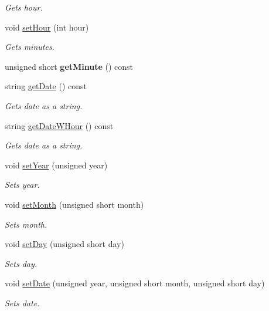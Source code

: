 \begin{DoxyCompactItemize}
\begin{DoxyCompactList}\small\item\em Gets hour. \end{DoxyCompactList}\item 
void \hyperlink{class_date_a39aed5716d41cecafc37be6a11556112}{set\+Hour} (int hour)
\begin{DoxyCompactList}\small\item\em Gets minutes. \end{DoxyCompactList}\item 
\mbox{\label{class_date_aa4d5c4e15ec04ff5fa18755d76acefe0}} 
unsigned short {\bfseries get\+Minute} () const
\item 
string \hyperlink{class_date_ac33192f734973548e97e9b5d8da44a5b}{get\+Date} () const
\begin{DoxyCompactList}\small\item\em Gets date as a string. \end{DoxyCompactList}\item 
string \hyperlink{class_date_a1c481aea42a3a310364f9a97661bee14}{get\+Date\+W\+Hour} () const
\begin{DoxyCompactList}\small\item\em Gets date as a string. \end{DoxyCompactList}\item 
void \hyperlink{class_date_a262bd42a1ed4378fa115dab321096736}{set\+Year} (unsigned year)
\begin{DoxyCompactList}\small\item\em Sets year. \end{DoxyCompactList}\item 
void \hyperlink{class_date_a6f2ab890b1935488aaa604b77caac4ae}{set\+Month} (unsigned short month)
\begin{DoxyCompactList}\small\item\em Sets month. \end{DoxyCompactList}\item 
void \hyperlink{class_date_a61e8103c09406f067992e15f36a7f910}{set\+Day} (unsigned short day)
\begin{DoxyCompactList}\small\item\em Sets day. \end{DoxyCompactList}\item 
void \hyperlink{class_date_a8c5fc0dd7ecf3bae6a1de5146fc566e4}{set\+Date} (unsigned year, unsigned short month, unsigned short day)
\begin{DoxyCompactList}\small\item\em Sets date. \end{DoxyCompactList}\item 

\end{DoxyCompactItemize}
